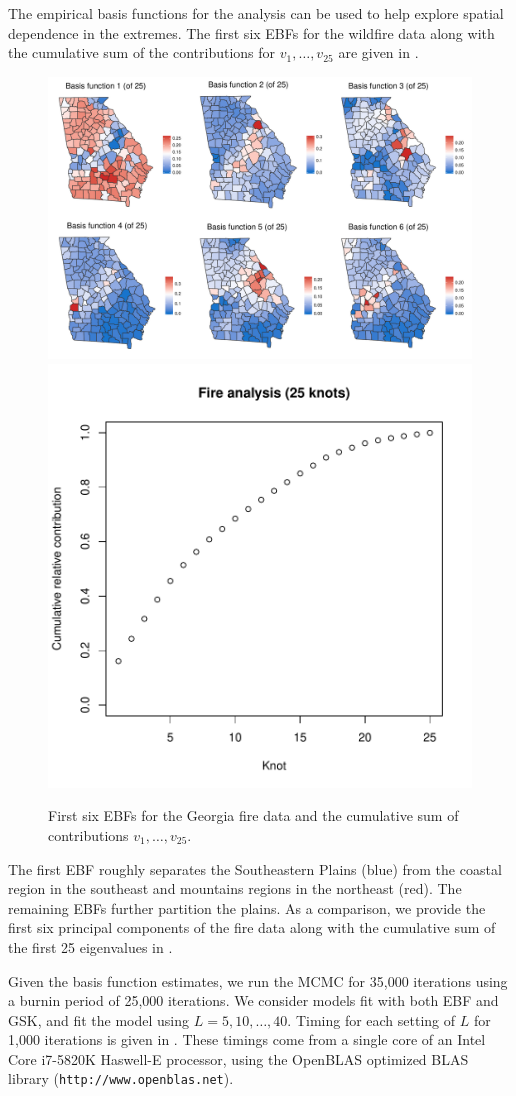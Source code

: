 The empirical basis functions for the analysis can be used to help explore spatial dependence in the extremes.
The first six EBFs for the wildfire data along with the cumulative sum of the contributions for $v_1, \ldots, v_{25}$ are given in .
\begin{figure}[htbp] %
  \centering
  \includegraphics[width=\linewidth]{plots/fire-ebf-panel.pdf}\\
  \includegraphics[width=0.45\linewidth]{plots/firev-25.pdf}
  \caption{First six EBFs for the Georgia fire data and the cumulative sum of contributions $v_1, \ldots, v_{25}$.}
  \label{ebfig:fire-ebfpanel}
\end{figure}
The first EBF roughly separates the Southeastern Plains (blue) from the coastal region in the southeast and mountains regions in the northeast (red).
The remaining EBFs further partition the plains.
As a comparison, we provide the first six principal components of the fire data along with the cumulative sum of the first 25 eigenvalues in .

Given the basis function estimates, we run the MCMC for 35,000 iterations using a burnin period of 25,000 iterations.
We consider models fit with both EBF and GSK, and fit the model using $L = 5, 10, \ldots, 40$.
Timing for each setting of $L$ for 1,000 iterations is given in .
These timings come from a single core of an Intel Core i7-5820K Haswell-E processor, using the OpenBLAS optimized BLAS library (\texttt{http://www.openblas.net}).

